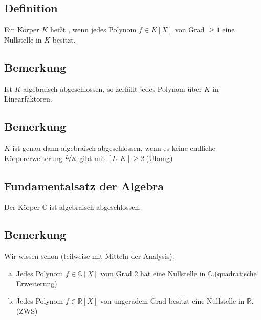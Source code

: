 \subsection[Definition: Algebraisch abgeschlossen]{Definition} %
\label{sub:181}
Ein Körper $K$ heißt , wenn jedes Polynom $f \in K[X]$ von Grad $\ge 1$ eine Nullstelle in $K$ besitzt.

\subsection[Bemerkung: In algebraisch abgeschlossenen Körper zerfällt jedes Polynom]{Bemerkung} %
\label{sub:182}
Ist $K$ algebraisch abgeschlossen, so zerfällt jedes Polynom über $K$ in Linearfaktoren.

\subsection[{Bemerkung: Algebraisch abgeschlossen $\iff$ $\not\exists L$ mit $[L:K]=2$}]{Bemerkung} %
\label{sub:183}
$K$ ist genau dann algebraisch abgeschlossen, wenn es keine endliche Körpererweiterung $\nicefrac{L}{K}$ gibt mit $[L:K]\ge 2$.\hfill (Übung)

\subsection{Fundamentalsatz der Algebra} %
\label{sub:184}
Der Körper $\mathds{C}$ ist algebraisch abgeschlossen.

\subsection[Bemerkung zu benutzten Erkenntnissen aus der Analysis]{Bemerkung} %
\label{sub:185}
Wir wissen schon (teilweise mit Mitteln der Analysis):
\begin{enumerate}[a)]
	\item Jedes Polynom $f \in \mathds{C}[X]$ vom Grad 2 hat eine Nullstelle in $\mathds{C}$.\hfill (quadratische Erweiterung)
	\item Jedes Polynom $f \in \mathds{R}[X]$ von ungeradem Grad besitzt eine Nullstelle in $\mathds{R}$.\hfill (ZWS)
\end{enumerate}


